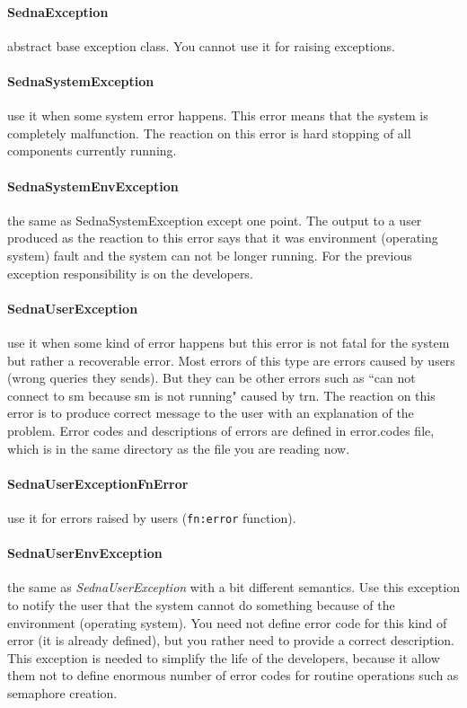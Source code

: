 \documentclass{article}
\begin{document}
\paragraph{SednaException} abstract base exception class. You cannot use it for raising
exceptions.

\paragraph{SednaSystemException} use it when some system error happens. This error means
that the system is completely malfunction. The reaction on this error is hard 
stopping of all components currently running.

\paragraph{SednaSystemEnvException} the same as SednaSystemException except one point.
The output to a user produced as the reaction to this error says that it was 
environment (operating system) fault and the system can not be longer running.
For the previous exception responsibility is on the developers.

\paragraph{SednaUserException} use it when some kind of error happens but this error
is not fatal for the system but rather a recoverable error. Most errors of 
this type are errors caused by users (wrong queries they sends). But they can
be other errors such as ``can not connect to sm because sm is not running"
caused by trn. The reaction on this error is to produce correct message to the
user with an explanation of the problem. Error codes and descriptions of errors
are defined in error.codes file, which is in the same directory as the file you
are reading now.

\paragraph{SednaUserExceptionFnError} use it for errors raised by users (\texttt{fn:error} function).

\paragraph{SednaUserEnvException} the same as \emph{SednaUserException} with a bit different
semantics.  Use this exception to notify the user that the system cannot do
something because of the environment (operating system). You need not define 
error code for this kind of error (it is already defined), but you
rather need to provide a correct description. This exception is needed to
simplify the life of the developers, because it allow them not to define
enormous number of error codes for routine operations such as semaphore
creation.
\end{document}
